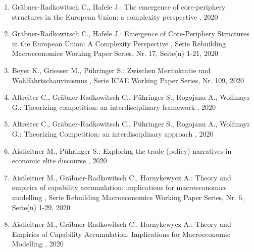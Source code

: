 \begin{enumerate}[leftmargin=*, labelsep=0.5cm]
	 \item Gräbner-Radkowitsch C., Hafele J.:  The emergence of core-periphery structures in the European Union: a complexity perspective  , 2020
	 \item Gräbner-Radkowitsch C., Hafele J.:  Emergence of Core-Periphery Structures in the European Union: A Complexity Perspective  , Serie Rebuilding Macroeconomics Working Paper Series, Nr. 17, Seite(n) 1-21, 2020
	 \item Beyer K., Griesser M., Pühringer S.:  Zwischen Meritokratie und Wohlfahrtschauvinismus  , Serie ICAE Working Paper Series, Nr. 109, 2020
	 \item Altreiter C., Gräbner-Radkowitsch C., Pühringer S., Rogojanu A., Wolfmayr G.:  Theorizing competition: an interdisciplinary framework  , 2020
	 \item Altreiter C., Gräbner-Radkowitsch C., Pühringer S., Rogojanu A., Wolfmayr G.:  Theorizing Competition: an interdisciplinary approach  , 2020
	 \item Aistleitner M., Pühringer S.:  Exploring the trade (policy) narratives in economic elite discourse  , 2020
	 \item Aistleitner M., Gräbner-Radkowitsch C., Hornykewycz A.:  Theory and empirics of capability accumulation: implications for macroeconomics modelling  , Serie Rebuilding Macroeconomics Working Paper Series, Nr. 6, Seite(n) 1-29, 2020
	 \item Aistleitner M., Gräbner-Radkowitsch C., Hornykewycz A.:  Theory and Empirics of Capability Accumulation: Implications for Macroeconomic Modelling  , 2020
\end{enumerate} 
